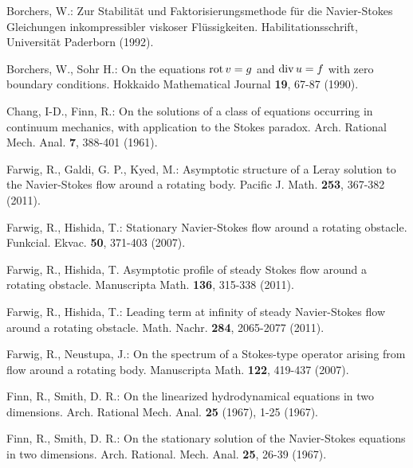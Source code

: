 \documentclass[11pt,a4paper]{article}
\begin{document}
\begin{thebibliography}{}


 Borchers, W.:
\newblock Zur Stabilit{\"a}t und Faktorisierungsmethode f{\"u}r die Navier-Stokes Gleichungen inkompressibler viskoser Fl{\"u}ssigkeiten. Habilitationsschrift, Universit{\"a}t Paderborn (1992).





 Borchers, W., Sohr H.:
\newblock On the equations ${\rm rot}\, v=g$ and ${\rm div}\, u=f$ with zero boundary conditions.
Hokkaido Mathematical Journal {\bf 19}, 67-87 (1990).


 Chang, I-D.,  Finn, R.:
\newblock On the solutions of a class of equations occurring in continuum mechanics, 
with application to the Stokes paradox. Arch. Rational Mech. Anal. {\bf 7}, 388-401 (1961).


 Farwig, R., Galdi, G. P., Kyed, M.: 
\newblock Asymptotic structure of a Leray solution to the Navier-Stokes flow around a rotating body.
Pacific J. Math. {\bf 253}, 367-382 (2011).


 Farwig, R.,  Hishida, T.: 
\newblock  Stationary Navier-Stokes flow around a rotating obstacle.
Funkcial. Ekvac. {\bf 50}, 371-403 (2007).


  Farwig, R., Hishida, T. 
\newblock Asymptotic profile of steady Stokes flow around a rotating obstacle.
Manuscripta Math. {\bf 136},  315-338 (2011).


 Farwig, R., Hishida, T.:
\newblock Leading term at infinity of steady Navier-Stokes flow around a rotating obstacle.
Math. Nachr. {\bf 284}, 2065-2077 (2011).


 Farwig, R., Neustupa, J.:
\newblock On the spectrum of a Stokes-type operator arising from flow around a rotating body.
Manuscripta Math. {\bf 122}, 419-437 (2007).


 Finn, R., Smith, D. R.:
\newblock On the linearized hydrodynamical equations in two dimensions.
Arch. Rational Mech. Anal. {\bf 25} (1967), 1-25 (1967).


 Finn, R., Smith, D. R.:
\newblock On the stationary solution of the Navier-Stokes equations in two dimensions.
Arch. Rational. Mech. Anal. {\bf 25}, 26-39 (1967).




\end{thebibliography}
\end{document}
